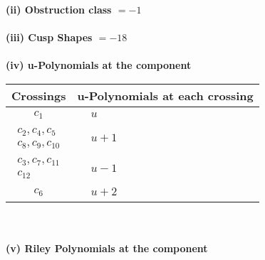 \documentclass[1p]{elsarticle_modified}
\theoremstyle{definition}
\begin{document}
\flushleft \textbf{(ii) Obstruction class $= -1$}\\~\\
\flushleft \textbf{(iii) Cusp Shapes $= -18$}\\~\\
\newpage\renewcommand{\arraystretch}{1}
\flushleft \textbf{(iv) u-Polynomials at the component}\newline \\
\begin{tabular}{m{50pt}|m{274pt}}
Crossings & \hspace{64pt}u-Polynomials at each crossing \\
\hline $$\begin{aligned}c_{1}\end{aligned}$$&$\begin{aligned}
&u
\end{aligned}$\\
\hline $$\begin{aligned}c_{2},c_{4},c_{5}\\c_{8},c_{9},c_{10}\end{aligned}$$&$\begin{aligned}
&u+1
\end{aligned}$\\
\hline $$\begin{aligned}c_{3},c_{7},c_{11}\\c_{12}\end{aligned}$$&$\begin{aligned}
&u-1
\end{aligned}$\\
\hline $$\begin{aligned}c_{6}\end{aligned}$$&$\begin{aligned}
&u+2
\end{aligned}$\\
\hline
\end{tabular}\\~\\
\newpage\renewcommand{\arraystretch}{1}
\flushleft \textbf{(v) Riley Polynomials at the component}\newline \\
\end{document}
